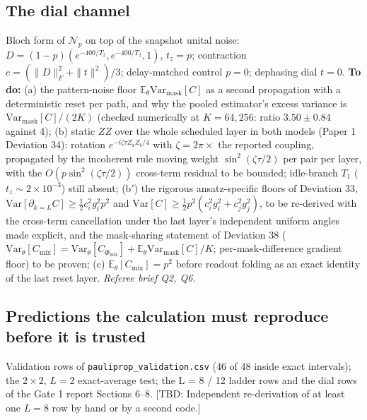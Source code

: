 \documentclass[11pt,a4paper]{article}
\newcommand{\tbd}[1]{\textcolor{orange!80!black}{[TBD: #1]}}
\newcommand{\Var}{\mathrm{Var}}
\newcommand{\Np}{\mathcal{N}_p}
\begin{document}
\subsection{The dial channel}
Bloch form of $\Np$ on top of the snapshot unital noise: $D = (1-p)(e^{-400/T_2}, e^{-400/T_2}, 1)$, $t_z = p$; contraction $c = (\|D\|_F^2 + \|t\|^2)/3$; delay-matched control $p = 0$; dephasing dial $t = 0$. \textbf{To do:} (a) the pattern-noise floor $\mathbb{E}_\theta\Var_{\mathrm{mask}}[C]$ as a second propagation with a deterministic reset per path, and why the pooled estimator's excess variance is $\Var_{\mathrm{mask}}[C]/(2K)$ (checked numerically at $K = 64, 256$: ratio $3.50 \pm 0.84$ against 4); (b) static $ZZ$ over the whole scheduled layer in both models (Paper 1 Deviation 34): rotation $e^{-i\zeta\tau Z_aZ_b/4}$ with $\zeta = 2\pi\times$ the reported coupling, propagated by the incoherent rule moving weight $\sin^2(\zeta\tau/2)$ per pair per layer, with the $O(p\sin^2(\zeta\tau/2))$ cross-term residual to be bounded; idle-branch $T_1$ ($t_z \sim 2\times10^{-3}$) still absent; (b$'$) the rigorous ansatz-specific floors of Deviation 33, $\Var[\partial_{k=L}C] \geq \tfrac12 c_i^2 g_i^2 p^2$ and $\Var[C] \geq \tfrac12 p^2(c_i^2 g_i^2 + c_j^2 g_j^2)$, to be re-derived with the cross-term cancellation under the last layer's independent uniform angles made explicit, and the mask-sharing statement of Deviation 38 ($\Var_\theta[C_{\mathrm{mix}}] = \Var_\theta[C_{\Phi_{\mathrm{mix}}}] + \mathbb{E}_\theta\Var_{\mathrm{mask}}[C]/K$; per-mask-difference gradient floor) to be proven; (c) $\mathbb{E}_\theta[C_{\mathrm{mix}}] = p^2$ before readout folding as an exact identity of the last reset layer. \emph{Referee brief Q2, Q6.}

\subsection{Predictions the calculation must reproduce before it is trusted}
Validation rows of \texttt{pauliprop\_validation.csv} (46 of 48 inside exact intervals); the $2\times2$, $L = 2$ exact-average test; the L = 8 / 12 ladder rows and the dial rows of the Gate 1 report Sections 6--8. \tbd{Independent re-derivation of at least one $L = 8$ row by hand or by a second code.}
\end{document}
